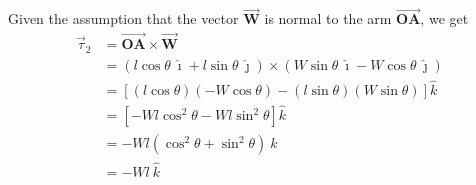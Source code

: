 Given the assumption that the vector \( \vec{\mathbf{W}} \) is normal to the arm \( \vec{\mathbf{OA}} \), we get
\[
    \begin{aligned}
        \vec{\tau}_2 & = \vec{\mathbf{OA}} \times \vec{\mathbf{W}}                                                                                                                \\
                     & = \left(l \cos \theta \ \hat{\imath} + l \sin \theta \ \hat{\jmath}\right) \times \left(W \sin \theta \ \hat{\imath} - W \cos \theta \ \hat{\jmath}\right) \\
                     & = \left[(l \cos \theta)(-W \cos \theta) - (l \sin \theta)(W \sin \theta)\right] \hat{k}                                                                    \\
                     & = \left[-W l \cos^2 \theta - W l \sin^2 \theta\right] \hat{k}                                                                                              \\
                     & = -W l (\cos^2 \theta + \sin^2 \theta) \ \hat{k}                                                                                                           \\
                     & = -W l \ \hat{k}
    \end{aligned}
\]
